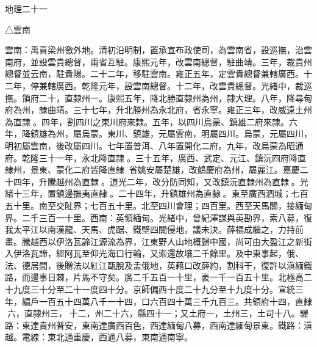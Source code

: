 
\begin{pinyinscope}
地理二十一

△雲南

雲南：禹貢梁州徼外地。清初沿明制，置承宣布政使司，為雲南省，設巡撫，治雲南府，並設雲貴總督，兩省互駐。康熙元年，改雲南總督，駐曲靖。三年，裁貴州總督並云南，駐貴陽。二十二年，移駐雲南。雍正五年，定雲貴總督兼轄廣西。十二年，停兼轄廣西。乾隆元年，設雲南總督。十二年，改雲貴總督。光緒中，裁巡撫。領府二十，直隸州一。康熙五年，降北勝直隸州為州，隸大理。八年，降尋甸府為州，隸曲靖。三十七年，升北勝州為永北府，省永寧。雍正三年，改威遠土州為直隸。四年，割四川之東川府來隸。五年，以四川烏蒙、鎮雄二府來隸。六年，降鎮雄為州，屬烏蒙。東川、鎮雄，元屬雲南，明屬四川。烏蒙，元屬四川，明初屬雲南，後改屬四川。七年置普洱、八年置開化二府。九年，改烏蒙為昭通府。乾隆三十一年，永北降直隸。三十五年，廣西、武定、元江、鎮沅四府降直隸州，景東、蒙化二府皆降直隸，省姚安屬楚雄，改鶴慶府為州，屬麗江。嘉慶二十四年，升騰越州為直隸。道光二年，改分防同知，又改鎮沅直隸州為直隸。光緒十三年，置鎮邊撫夷直隸。二十四年，升鎮雄州為直隸。東至廣西泗城；七百五十里。南至交阯界；七百五十里。北至四川會理；四百里。西至天馬關，接緬甸界。二千三百一十里。西南：英領緬甸。光緒中，曾紀澤謀與英勘界，索八募，復我太平江以南漢龍、天馬、虎踞、鐵壁四關侵地，議未決。薛福成繼之，力持前畫。騰越西以伊洛瓦諦江源流為界，江東野人山地概歸中國，尚可由大盈江之新街入伊洛瓦諦，經阿瓦至仰光海口行輪，又索還故壤二千餘里。及中東事起，俄、法、德居間，後贈法以紅江甌脫及孟俄地，英藉口改薛約，割科干，復許以滇緬鐵路，而邊事日棘，片馬不守矣。廣二千五百一十里，袤一千一百五十里。北極高二十九度三十分至二十一度四十分。京師偏西十度二十九分至十九度十分。宣統三年，編戶一百五十四萬八千一十四，口六百四十萬三千九百三。共領府十四，直隸六，直隸州三，十二，州二十六，縣四十一；又土府一，土州三，土司十八。驛路：東達貴州普安，東南達廣西百色，西達緬甸八募，西南達緬甸景東。鐵路：滇越。電線：東北通重慶，西通八募，東南通南寧。


\end{pinyinscope}
